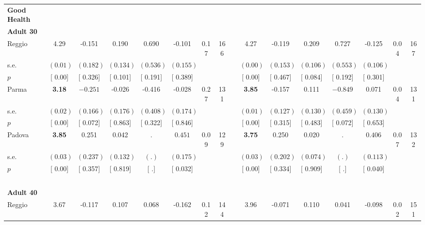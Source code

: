 \begin{longtable}{L{8em} c c c c c c c p{1em} c c c c c c c}
\textbf{Good Health} \\*
\quad \quad \textbf{Adult 30} & & & & & & & & & & & & & & & \\* 
\quad \quad \quad Reggio& 4.29 &    -0.151 &     0.190 &     0.690 &    -0.101 &      0.17 &       166 & & 4.27 &    -0.119 & $ \mathbf{    0.209}$ &     0.727 &    -0.125 &      0.04 &       167  \\*
\quad \quad \quad \quad s.e.& $ (     0.01)$ & $ (    0.182)$ & $ (    0.134)$ & $ (    0.536)$ & $ (    0.155)$ & & & & $ (     0.00)$ & $ (    0.153)$ & $ (    0.106)$ & $ (    0.553)$ & $ (    0.106)$ & &  \\*
\quad \quad \quad \quad $ p$ & [     0.00] & [    0.326] & [    0.101] & [    0.191] & [    0.389] & & & & [     0.00] & [    0.467] & [    0.084] & [    0.192] & [    0.301] & &  \\[1em]
\quad \quad \quad Parma& \textbf{     3.18} & $ \mathbf{   -0.251}$ &    -0.026 &    -0.416 &    -0.028 &      0.27 &       131 & & \textbf{     3.85} &    -0.157 &     0.111 & $ \mathbf{   -0.849}$ &     0.071 &      0.04 &       131  \\*
\quad \quad \quad \quad s.e.& $ (     0.02)$ & $ (    0.166)$ & $ (    0.176)$ & $ (    0.408)$ & $ (    0.174)$ & & & & $ (     0.01)$ & $ (    0.127)$ & $ (    0.130)$ & $ (    0.459)$ & $ (    0.130)$ & &  \\*
\quad \quad \quad \quad $ p$ & [     0.00] & [    0.072] & [    0.863] & [    0.322] & [    0.846] & & & & [     0.00] & [    0.315] & [    0.483] & [    0.072] & [    0.653] & &  \\[1em]
\quad \quad \quad Padova& \textbf{     3.85} &     0.251 &     0.042 &         . & $ \mathbf{    0.451}$ &      0.09 &       129 & & \textbf{     3.75} &     0.250 &     0.020 &         . & $ \mathbf{    0.406}$ &      0.07 &       132  \\*
\quad \quad \quad \quad s.e.& $ (     0.03)$ & $ (    0.237)$ & $ (    0.132)$ & $ (        .)$ & $ (    0.175)$ & & & & $ (     0.03)$ & $ (    0.202)$ & $ (    0.074)$ & $ (        .)$ & $ (    0.113)$ & &  \\*
\quad \quad \quad \quad $ p$ & [     0.00] & [    0.357] & [    0.819] & [        .] & [    0.032] & & & & [     0.00] & [    0.334] & [    0.909] & [        .] & [    0.040] & &  \\[1em]
~\\[1em]
\quad \quad \textbf{Adult 40} & & & & & & & & & & & & & & & \\* 
\quad \quad \quad Reggio& 3.67 &    -0.117 &     0.107 &     0.068 &    -0.162 &      0.12 &       144 & & 3.96 &    -0.071 &     0.110 &     0.041 &    -0.098 &      0.02 &       151  \\*

\end{longtable}
